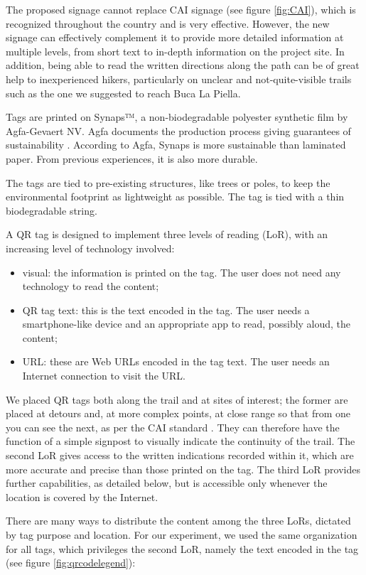 \documentclass[sustainability,article,submit,pdftex,moreauthors]{Definitions/mdpi}
\begin{document}
The proposed signage cannot replace CAI signage (see figure \ref{fig:CAI}), which is recognized throughout the country and is very effective. However, the new signage can effectively complement it to provide more detailed information at multiple levels, from short text to in-depth information on the project site. In addition, being able to read the written directions along the path can be of great help to inexperienced hikers, particularly on unclear and not-quite-visible trails such as the one we suggested to reach Buca La Piella.

Tags are printed on Synaps™, a non-biodegradable polyester synthetic film by Agfa-Gevaert NV. Agfa documents the production process giving guarantees of sustainability . According to Agfa, Synaps is more sustainable than laminated paper. From previous experiences, it is also more durable.

The tags are tied to pre-existing structures, like trees or poles, to keep the environmental footprint as lightweight as possible. The tag is tied with a thin biodegradable string.

A QR tag is designed to implement three levels of reading (LoR), with an increasing level of technology involved:
\begin{itemize}
    \item visual: the information is printed on the tag. The user does not need any technology to read the content;
    \item QR tag text: this is the text encoded in the tag. The user needs a smartphone-like device and an appropriate app to read, possibly aloud, the content;
    \item URL: these are Web URLs encoded in the tag text. The user needs an Internet connection to visit the URL.
\end{itemize}

We placed QR tags both along the trail and at sites of interest; the former are placed at detours and, at more complex points, at close range so that from one you can see the next, as per the CAI standard \cite{cai10}. They can therefore have the function of a simple signpost to visually indicate the continuity of the trail. The second LoR gives access to the written indications recorded within it, which are more accurate and precise than those printed on the tag. The third LoR provides further capabilities, as detailed below, but is accessible only whenever the location is covered by the Internet. 

There are many ways to distribute the content among the three LoRs, dictated by tag purpose and location. For our experiment, we used the same organization for all tags, which privileges the second LoR, namely the text encoded in the tag (see figure \ref{fig:qrcodelegend}): 
\end{document}
